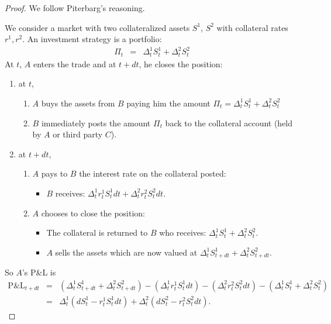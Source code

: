\documentclass[11pt,english]{amsart}
\newcommand{\PnL}{\mathrm{P\&L}}
\theoremstyle{definition}
\begin{document}
\begin{proof}
We follow Piterbarg's reasoning. 

We consider a market with two collateralized assets $S^1$, $S^2$ with collateral rates $r^1,r^2$. An investment strategy is a portfolio: 
\begin{eqnarray*}
	\Pi_t &=& \Delta^1_t S^1_t + \Delta^2_t S^2_t    
\end{eqnarray*} 
At $t$, $A$ enters the trade and at $t+dt$, he closes the position:
\begin{enumerate}
\item at $t$, 
\begin{enumerate}
\item $A$ buys the assets from $B$ paying him the amount $\Pi_t = \Delta^1_t S^1_t + \Delta^2_t S^2_t $\item $B$ immediately posts the amount $\Pi_t$ back to the collateral account (held by $A$ or third party $C$).
\end{enumerate}
\item at $t+dt$, 
\begin{enumerate}
\item $A$ pays to $B$ the interest rate on the collateral posted:
\begin{itemize}
\item $B$ receives: $\Delta^1_t r^1_t S^1_{t} dt + \Delta^2_t r^2_t S^2_{t}dt$. 
\end{itemize}
\item $A$ chooses to close the position:
\begin{itemize}
\item The collateral is returned to $B$ who receives: $\Delta^1_t S^1_t + \Delta^2_t S^2_t$. 
\item $A$ sells the assets which are now valued at $\Delta^1_t S^1_{t+dt} + \Delta^2_t S^2_{t+dt}$. 
\end{itemize}
\end{enumerate}
\end{enumerate}
So $A$'s P\&L is 
\begin{eqnarray*}
	\PnL_{t+dt}
	&=&  \left(\Delta^1_t S^1_{t+dt} + \Delta^2_t S^2_{t+dt}\right) 
	-  \left(\Delta^1_t r^1_t S^1_{t} dt\right)  - \left(\Delta^2_t r^2_t S^2_{t}dt \right)  
	- \left(\Delta^1_t S^1_{t} + \Delta^2_t S^2_{t}\right)    \\
	&=&  \Delta^1_t \left(dS^1_{t} - r^1_tS^1_{t}dt\right)
	+ \Delta^2_t \left(dS^2_{t} - r^2_tS^2_{t}dt\right)    .
\end{eqnarray*} 


\end{proof}
\end{document}
